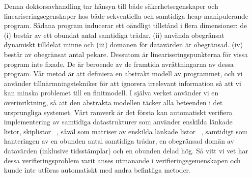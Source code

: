 Denna doktorsavhandling tar hänsyn till både säkerhetsegenskaper och lineariseringsegenskaper hos
både sekventiella och samtidiga heap-manipulerande program.
Sådana program inducerar ett oändligt tillstånd i flera dimensioner:
de %
(i) består av ett obundat antal samtidiga trådar,%
(ii) använda obegränsat dynamiskt tilldelat minne och%
(iii) domänen för datavärden är obegränsad. %
(iv) består av obegränsat antal pekare.
Dessutom är lineariseringspunkterna för vissa program inte fixade. De är beroende av de framtida avrättningarna av dessa program.
Vår metod är att definiera en abstrakt modell av programmet, och vi använder tillnärmningstekniker för att ignorera irrelevant information så att vi kan minska problemet till en finitmodell. I själva verket använder vi en överinriktning, så att den abstrakta modellen täcker alla beteenden i det ursprungliga systemet. Vårt ramverk är det första
kan automatiskt verifiera implementering av samtidiga datastrukturer som använder
enskilda länkade listor, skiplistor ~\cite{Fomitchev:2004,ArtOfMpP,Sundell:2005},
såväl som matriser av enskilda länkade listor ~\cite {ts-stack},
samtidigt som hanteringen av en obunden
antal samtidiga trådar, en obegränsad domän av datavärden
(inklusive tidsstämplar) och en obunden delad hög. Så vitt vi vet har dessa verifieringsproblem varit
anses utmanande i verifieringsgemenskapen och
kunde inte utföras automatiskt med andra befintliga metoder.





